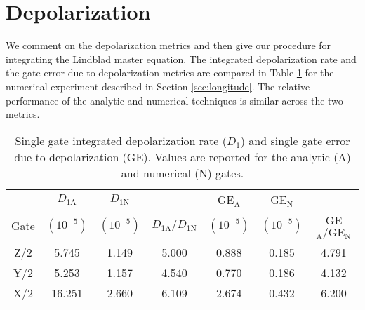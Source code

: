 \section{Depolarization \label{appendix:longitude}}
We comment on the depolarization metrics and then give
our procedure for integrating the Lindblad master equation.
The integrated depolarization rate and the gate error due to
depolarization metrics are compared in Table \ref{tab:longitude} for the
numerical experiment described in Section \ref{sec:longitude}.
The relative performance of the analytic and numerical techniques
is similar across the two metrics.

\begin{table}[ht]
  \begin{tabular}{c | c | c | c | c | c | c}
         & $D_{1\textrm{A}}$ & $D_{1\textrm{N}}$ & & GE$_{\textrm{A}}$ & GE$_{\textrm{N}}$ &\\
    Gate & $(10^{-5})$ & $(10^{-5})$ & $D_{1\textrm{A}}/ D_{1\textrm{N}}$ & $(10^{-5})$ &
    $(10^{-5})$ & GE$_{\textrm{A}} / \textrm{GE}_{\textrm{N}}$\\
    \hline
    Z/2 & 5.745 & 1.149 & 5.000 & 0.888   & 0.185  & 4.791 \\
    Y/2 & 5.253 & 1.157 & 4.540 & 0.770 & 0.186   & 4.132\\
    X/2 & 16.251 & 2.660 & 6.109 & 2.674 & 0.432  & 6.200\\
  \end{tabular}
  \caption{
    Single gate integrated depolarization rate ($D_{1}$)
    and single gate error due to depolarization (GE).
    Values are reported for the analytic (A) and numerical (N) gates.
  }
  \label{tab:longitude}
\end{table}

